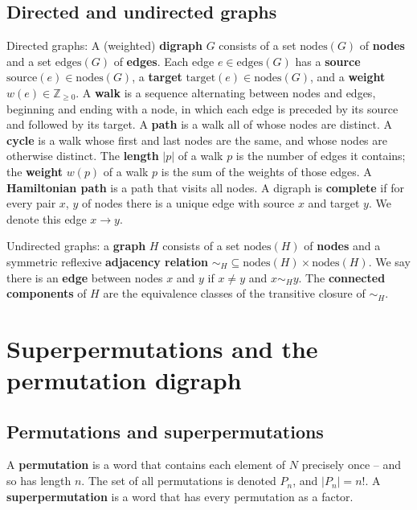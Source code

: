 \documentclass[a4paper]{article}
\theoremstyle{definition}
\theoremstyle{remark}
\let\definiendum\textbf
\begin{document}
\subsection{Directed and undirected graphs}
\def\nodes{\mathrm{nodes}}
\def\edges{\mathrm{edges}}
\def\source{\mathrm{source}}
\def\target{\mathrm{target}}
Directed graphs: A (weighted) \definiendum{digraph} $G$ consists of a set $\nodes(G)$ of \definiendum{nodes} and a set $\edges(G)$ of \definiendum{edges}. Each edge $e\in\edges(G)$ has a \definiendum{source} $\source(e)\in\nodes(G)$, a \definiendum{target} $\target(e)\in\nodes(G)$, and a \definiendum{weight} $w(e)\in\mathbb{Z}_{\ge 0}$.
%
A \definiendum{walk} is a sequence alternating between nodes and edges, beginning and ending with a node, in which each edge is preceded by its source and followed by its target.
%
A \definiendum{path} is a walk all of whose nodes are distinct.
%
A \definiendum{cycle} is a walk whose first and last nodes are the same, and whose nodes are otherwise distinct.
%
The \definiendum{length} $|p|$ of a walk $p$ is the number of edges it contains; the \definiendum{weight} $w(p)$ of a walk $p$ is the sum of the weights of those edges.
%
A \definiendum{Hamiltonian path} is a path that visits all nodes.
%
A digraph is \definiendum{complete} if for every pair $x$, $y$ of nodes there is a unique edge with source $x$ and target $y$. We denote this edge $x\to y$.

Undirected graphs: a \definiendum{graph} $H$ consists of a set $\nodes(H)$ of \definiendum{nodes} and a symmetric reflexive \definiendum{adjacency relation} $\mathord{\sim_H} \subseteq \nodes(H)\times\nodes(H)$.
%
We say there is an \definiendum{edge} between nodes $x$ and $y$ if $x\neq y$ and $x\sim_Hy$.
%
The \definiendum{connected components} of $H$ are the equivalence classes of the transitive closure of $\sim_H$.

\section{Superpermutations and the permutation digraph}
%
\subsection{Permutations and superpermutations}
A \definiendum{permutation} is a word that contains each element of $N$ precisely once -- and so has length $n$. The set of all permutations is denoted $P_n$, and $|P_n|=n!$. A \definiendum{superpermutation} is a word that has every permutation as a factor.
\end{document}

